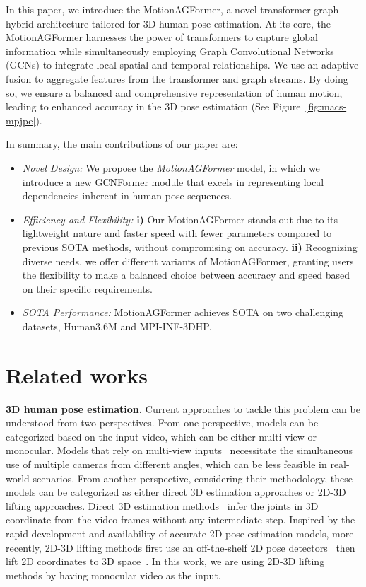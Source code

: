 \documentclass[10pt,twocolumn,letterpaper]{article}
\begin{document}
In this paper, we introduce the MotionAGFormer, a novel transformer-graph hybrid architecture tailored for 3D human pose estimation. At its core, the MotionAGFormer harnesses the power of transformers to capture global information while simultaneously employing Graph Convolutional Networks (GCNs) to integrate local spatial and temporal relationships. We use an adaptive fusion to aggregate features from the transformer and graph streams. By doing so, we ensure a balanced and comprehensive representation of human motion, leading to enhanced accuracy in the 3D pose estimation (See Figure~\ref{fig:macs-mpjpe}).


In summary, the main contributions of our paper are: 
\begin{itemize}
  \setlength\itemsep{0em}
  \item \textit{Novel Design:} We propose the \textit{MotionAGFormer} model, in which we introduce a new GCNFormer module that excels in representing local dependencies inherent in human pose sequences.


  \item \textit{Efficiency and Flexibility:} \textbf{i)} Our MotionAGFormer stands out due to its lightweight nature and faster speed with fewer parameters compared to previous SOTA methods, without compromising on accuracy. \textbf{ii)} Recognizing diverse needs, we offer different variants of MotionAGFormer, granting users the flexibility to make a balanced choice between accuracy and speed based on their specific requirements.

  \item \textit{SOTA Performance:} MotionAGFormer achieves SOTA on two challenging datasets, Human3.6M and MPI-INF-3DHP.
\end{itemize}

\section{Related works}
\textbf{3D human pose estimation.}
Current approaches to tackle this problem can be understood from two perspectives. From one perspective, models can be categorized based on the input video, which can be either multi-view or monocular. Models that rely on multi-view inputs~\cite{zhang2021adafuse, reddy2021tessetrack, chun2023learnable, iskakov2019learnable, remelli2020lightweight} necessitate the simultaneous use of multiple cameras from different angles, which can be less feasible in real-world scenarios. From another perspective, considering their methodology, these models can be categorized as either direct 3D estimation approaches or 2D-3D lifting approaches. Direct 3D estimation methods~\cite{pavlakos2018ordinal, zhou2019hemlets, sun2018integral, pavlakos2017coarse} infer the joints in 3D coordinate from the video frames without any intermediate step. Inspired by the rapid development and availability of accurate 2D pose estimation models, more recently, 2D-3D lifting methods first use an off-the-shelf 2D pose detectors~\cite{cpn, hrnet, stackedhourglass} then lift 2D coordinates to 3D space~\cite{poseformer, poseformerv2, motionbert, STCFormer, mixste}. 
In this work, we are using 2D-3D lifting methods by having monocular video as the input.
\end{document}
